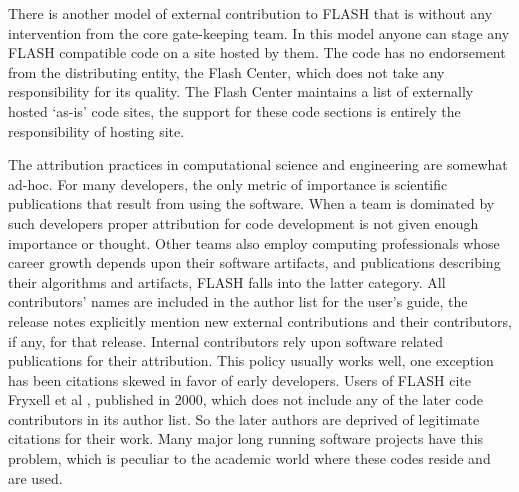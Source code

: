 There is another model of external contribution to FLASH that is
without any intervention from the core gate-keeping team. In this
model anyone can stage any FLASH compatible code on a site hosted by
them. The code has no endorsement from the distributing entity, the
Flash Center, which does not take any responsibility for its
quality. The Flash Center maintains a list of externally hosted
`as-is' code sites, the support for these code sections is entirely
the responsibility of hosting site. 

The attribution practices in computational science and engineering are
somewhat ad-hoc. For many developers, the only metric of importance is scientific
publications that result from using the software. When a team is
dominated by such developers proper attribution for code development
is not given enough importance or thought. Other teams also employ
computing professionals whose career growth depends upon their
software artifacts, and publications describing their algorithms and
artifacts, FLASH falls into the latter category. All 
contributors' names are included in the author list for the user's
guide, the release notes explicitly mention new external
contributions and their contributors, if any, for that
release. Internal contributors rely upon software related publications
for their attribution. This policy  usually works well, one
exception  has been citations skewed in favor of early
developers. Users of FLASH cite Fryxell et al \cite{Fryxell2000},
published in 2000, which does not include any of the later code 
contributors in its author list.  So the later authors
are deprived of legitimate citations for their work.  Many major long
running software projects have this problem, which is peculiar to the academic world where these
codes reside and are used.  

